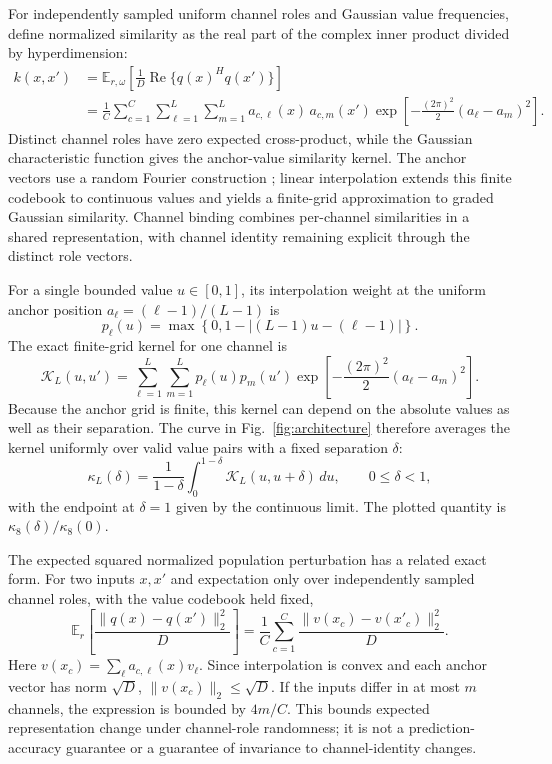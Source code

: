 For independently sampled uniform channel roles and Gaussian value
frequencies, define normalized similarity as the real part of the complex
inner product divided by hyperdimension:
\[
 \begin{aligned}
 k(x,x')&=\mathbb{E}_{r,\omega}\!\left[\frac{1}{D}
                    \operatorname{Re}\{q(x)^Hq(x')\}\right]\\
   &=\frac{1}{C}\sum_{c=1}^{C}\sum_{\ell=1}^{L}
      \sum_{m=1}^{L}a_{c,\ell}(x)\,a_{c,m}(x')
      \exp\!\left[-\frac{(2\pi)^2}{2}(a_\ell-a_m)^2\right].
 \end{aligned}
\]
Distinct channel roles have zero expected cross-product, while the Gaussian
characteristic function gives the anchor-value similarity kernel. The anchor
vectors use a random Fourier construction \citep{rahimi2007features}; linear
interpolation extends this finite codebook to continuous values and yields a
finite-grid approximation to graded Gaussian similarity. Channel binding
combines per-channel similarities in a shared representation, with channel
identity remaining explicit through the distinct role vectors.

For a single bounded value $u\in[0,1]$, its interpolation weight at the
uniform anchor position $a_\ell=(\ell-1)/(L-1)$ is
\[
  p_\ell(u)=\max\!\left\{0,1-\left|(L-1)u-(\ell-1)\right|\right\}.
\]
The exact finite-grid kernel for one channel is
\[
  \mathcal{K}_L(u,u')=\sum_{\ell=1}^{L}\sum_{m=1}^{L}
      p_\ell(u)p_m(u')
      \exp\!\left[-\frac{(2\pi)^2}{2}(a_\ell-a_m)^2\right].
\]
Because the anchor grid is finite, this kernel can depend on the absolute
values as well as their separation. The curve in Fig.~\ref{fig:architecture}
therefore averages the kernel uniformly over valid value pairs with a fixed
separation $\delta$:
\[
  \kappa_L(\delta)=\frac{1}{1-\delta}
      \int_{0}^{1-\delta}\mathcal{K}_L(u,u+\delta)\,du,
      \qquad 0\leq\delta<1,
\]
with the endpoint at $\delta=1$ given by the continuous limit. The plotted
quantity is $\kappa_8(\delta)/\kappa_8(0)$.

The expected squared normalized population perturbation has a related exact
form. For two inputs $x,x'$ and expectation only over independently sampled
channel roles, with the value codebook held fixed,
\[
 \mathbb{E}_{r}\!\left[\frac{\|q(x)-q(x')\|_2^2}{D}\right]
   =\frac{1}{C}\sum_{c=1}^{C}
       \frac{\|v(x_c)-v(x'_c)\|_2^2}{D}.
\]
Here $v(x_c)=\sum_\ell a_{c,\ell}(x)v_\ell$. Since interpolation is convex
and each anchor vector has norm $\sqrt{D}$,
$\|v(x_c)\|_2\leq\sqrt{D}$. If the inputs differ in at most $m$ channels,
the expression is bounded by $4m/C$. This bounds expected representation
change under channel-role randomness; it is not a prediction-accuracy
guarantee or a guarantee of invariance to channel-identity changes.

